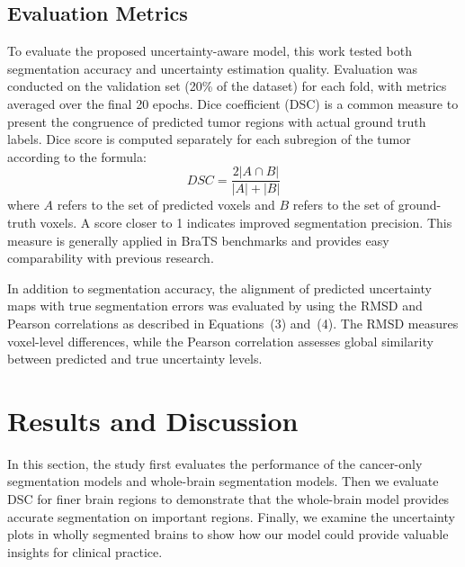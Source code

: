 \documentclass[11pt,letterpaper]{article}
\begin{document}
\subsection{Evaluation Metrics}
To evaluate the proposed uncertainty-aware model, this work tested both segmentation accuracy and uncertainty estimation quality. Evaluation was conducted on the validation set (20\% of the dataset) for each fold, with metrics averaged over the final 20 epochs.
Dice coefficient (DSC) is a common measure to present the congruence of predicted tumor regions with actual ground truth labels. Dice score is computed separately for each subregion of the tumor according to the formula:
\begin{equation}
DSC = \frac{2|A \cap B|}{|A| + |B|}
\end{equation}
where $A$ refers to the set of predicted voxels and $B$ refers to the set of ground-truth voxels. A score closer to 1 indicates improved segmentation precision. This measure is generally applied in BraTS benchmarks and provides easy comparability with previous research.

In addition to segmentation accuracy, the alignment of predicted uncertainty maps with true segmentation errors was evaluated by using the RMSD and Pearson correlations as described in Equations~(3) and~(4). The RMSD measures voxel-level differences, while the Pearson correlation assesses global similarity between predicted and true uncertainty levels.
\section{Results and Discussion}
In this section, the study first evaluates the performance of the cancer-only segmentation models and whole-brain segmentation models. Then we evaluate DSC for finer brain regions to demonstrate that the whole-brain model provides accurate segmentation on important regions. Finally, we examine the uncertainty plots in wholly segmented brains to show how our model could provide valuable insights for clinical practice.
\end{document}
